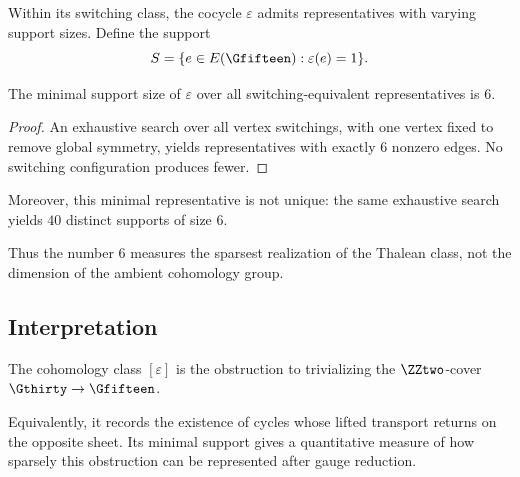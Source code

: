 Within its switching class, the cocycle $\varepsilon$ admits
representatives with varying support sizes. Define the support
\[
S=\{e\in E(\Gfifteen):\varepsilon(e)=1\}.
\]

\begin{proposition}
The minimal support size of $\varepsilon$ over all switching-equivalent
representatives is $6$.
\end{proposition}

\begin{proof}
An exhaustive search over all vertex switchings, with one vertex fixed to
remove global symmetry, yields representatives with exactly $6$ nonzero
edges. No switching configuration produces fewer.
\end{proof}

Moreover, this minimal representative is not unique: the same exhaustive
search yields $40$ distinct supports of size $6$.

Thus the number $6$ measures the sparsest realization of the Thalean
class, not the dimension of the ambient cohomology group.

\subsection{Interpretation}

The cohomology class $[\varepsilon]$ is the obstruction to trivializing
the $\ZZtwo$-cover $\Gthirty\to\Gfifteen$.

Equivalently, it records the existence of cycles whose lifted transport
returns on the opposite sheet. Its minimal support gives a quantitative
measure of how sparsely this obstruction can be represented after gauge
reduction.
